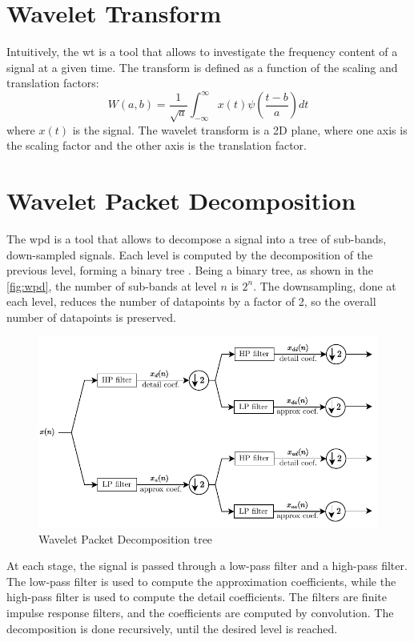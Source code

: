 \section{Wavelet Transform}
Intuitively, the \gls{wt} is a tool that allows to investigate the frequency content of a signal at a given time. The transform is defined as a function of the scaling and translation factors:
\begin{equation}
W(a,b) =\frac{1}{\sqrt{a}} \int_{-\infty}^{\infty} x(t) \psi \left( \frac{t-b}{a} \right)dt
\end{equation}
where $x(t)$ is the signal. The wavelet transform is a 2D plane, where one axis is the scaling factor and the other axis is the translation factor.

\section{Wavelet Packet Decomposition}
The \gls{wpd} is a tool that allows to decompose a signal into a tree of sub-bands, down-sampled signals. Each level is computed by the decomposition of the previous level, forming a binary tree \cite{akansu1991}. Being a binary tree, as shown in the \autoref{fig:wpd}, the number of sub-bands at level $n$ is $2^n$. The downsampling, done at each level, reduces the number of datapoints by a factor of 2, so the overall number of datapoints is preserved.

\begin{figure}
\centering
\includegraphics{images/wpd.pdf}
\caption{Wavelet Packet Decomposition tree}
\label{fig:wpd}
\end{figure}


At each stage, the signal is passed through a low-pass filter and a high-pass filter. The low-pass filter is used to compute the approximation coefficients, while the high-pass filter is used to compute the detail coefficients. The filters are finite impulse response filters, and the coefficients are computed by convolution. The decomposition is done recursively, until the desired level is reached.

